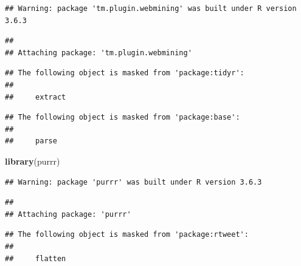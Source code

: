 \documentclass[]{article}
\newenvironment{Shaded}{\begin{snugshade}}{\end{snugshade}}
\newcommand{\ControlFlowTok}[1]{\textcolor[rgb]{0.13,0.29,0.53}{\textbf{#1}}}
\newcommand{\DataTypeTok}[1]{\textcolor[rgb]{0.13,0.29,0.53}{#1}}
\newcommand{\KeywordTok}[1]{\textcolor[rgb]{0.13,0.29,0.53}{\textbf{#1}}}
\newcommand{\NormalTok}[1]{#1}
\newcommand{\OperatorTok}[1]{\textcolor[rgb]{0.81,0.36,0.00}{\textbf{#1}}}
\newcommand{\StringTok}[1]{\textcolor[rgb]{0.31,0.60,0.02}{#1}}
\begin{document}
\begin{verbatim}
## Warning: package 'tm.plugin.webmining' was built under R version 3.6.3
\end{verbatim}

\begin{verbatim}
## 
## Attaching package: 'tm.plugin.webmining'
\end{verbatim}

\begin{verbatim}
## The following object is masked from 'package:tidyr':
## 
##     extract
\end{verbatim}

\begin{verbatim}
## The following object is masked from 'package:base':
## 
##     parse
\end{verbatim}

\begin{Shaded}
\begin{Highlighting}[]
\KeywordTok{library}\NormalTok{(purrr)}
\end{Highlighting}
\end{Shaded}

\begin{verbatim}
## Warning: package 'purrr' was built under R version 3.6.3
\end{verbatim}

\begin{verbatim}
## 
## Attaching package: 'purrr'
\end{verbatim}

\begin{verbatim}
## The following object is masked from 'package:rtweet':
## 
##     flatten
\end{verbatim}

\begin{Shaded}
\end{Shaded}
\end{document}
